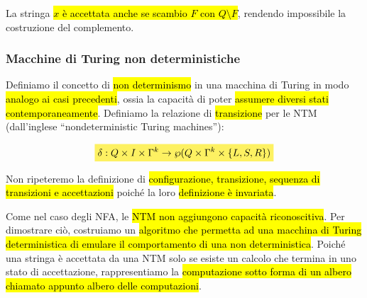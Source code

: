\documentclass[a4paper,11pt,oneside]{article}
\theoremstyle{plain}
\theoremstyle{definition}
\theoremstyle{remark}
\newcommand{\mhl}[1]{\colorbox{hlcolor}{$\displaystyle #1$}}
\begin{document}
La stringa \hl{$x$ è accettata anche se scambio $F$ con $Q \setminus F$},
rendendo impossibile la costruzione del complemento.

\subsubsection{Macchine di Turing non deterministiche}\label{sec:ntm}

Definiamo il concetto di \hl{non determinismo} in una macchina di Turing in modo
\hl{analogo ai casi precedenti}, ossia la capacità di poter \hl{assumere diversi
stati contemporaneamente}. Definiamo la relazione di \hl{transizione} per le NTM
(dall'inglese ``nondeterministic Turing machines''):

\begin{equation}
  \mhl{
    \delta : Q \times I \times \Gamma^k \to
      \wp(Q \times \Gamma^k \times \{ L,S,R \})
  }
\end{equation}

Non ripeteremo la definizione di \hl{configurazione, transizione, sequenza di
transizioni e accettazioni} poiché la loro \hl{definizione è invariata}.

Come nel caso degli NFA, le \hl{NTM non aggiungono capacità riconoscitiva}. Per
dimostrare ciò, costruiamo un \hl{algoritmo che permetta ad una macchina di
Turing deterministica di emulare il comportamento di una non deterministica}.
Poiché una stringa è accettata da una NTM solo se esiste un calcolo che termina
in uno stato di accettazione, rappresentiamo la \hl{computazione sotto forma di
un albero chiamato appunto albero delle computazioni}.
\end{document}

